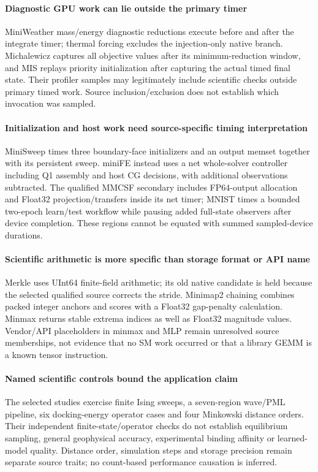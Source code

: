\paragraph{Diagnostic GPU work can lie outside the primary timer} MiniWeather mass/energy diagnostic reductions execute before and after the integrate timer; thermal forcing excludes the injection-only native branch. Michalewicz captures all objective values after its minimum-reduction window, and MIS replays priority initialization after capturing the actual timed final state. Their profiler samples may legitimately include scientific checks outside primary timed work. Source inclusion/exclusion does not establish which invocation was sampled.

\paragraph{Initialization and host work need source-specific timing interpretation} MiniSweep times three boundary-face initializers and an output memset together with its persistent sweep. miniFE instead uses a net whole-solver controller including Q1 assembly and host CG decisions, with additional observations subtracted. The qualified MMCSF secondary includes FP64-output allocation and Float32 projection/transfers inside its net timer; MNIST times a bounded two-epoch learn/test workflow while pausing added full-state observers after device completion. These regions cannot be equated with summed sampled-device durations.

\paragraph{Scientific arithmetic is more specific than storage format or API name} Merkle uses UInt64 finite-field arithmetic; its old native candidate is held because the selected qualified source corrects the stride. Minimap2 chaining combines packed integer anchors and scores with a Float32 gap-penalty calculation. Minmax returns stable extrema indices as well as Float32 magnitude values. Vendor/API placeholders in minmax and MLP remain unresolved source memberships, not evidence that no SM work occurred or that a library GEMM is a known tensor instruction.

\paragraph{Named scientific controls bound the application claim} The selected studies exercise finite Ising sweeps, a seven-region wave/PML pipeline, six docking-energy operator cases and four Minkowski distance orders. Their independent finite-state/operator checks do not establish equilibrium sampling, general geophysical accuracy, experimental binding affinity or learned-model quality. Distance order, simulation steps and storage precision remain separate source traits; no count-based performance causation is inferred.
